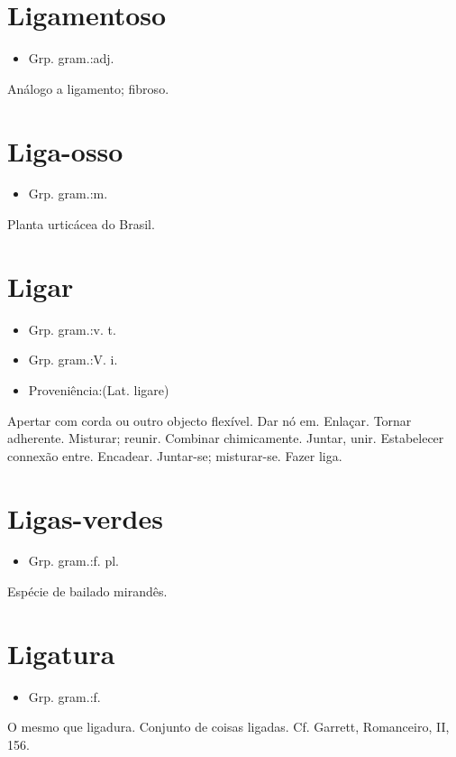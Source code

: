 \section{Ligamentoso}
\begin{itemize}
\item {Grp. gram.:adj.}
\end{itemize}
Análogo a ligamento; fibroso.
\section{Liga-osso}
\begin{itemize}
\item {Grp. gram.:m.}
\end{itemize}
Planta urticácea do Brasil.
\section{Ligar}
\begin{itemize}
\item {Grp. gram.:v. t.}
\end{itemize}
\begin{itemize}
\item {Grp. gram.:V. i.}
\end{itemize}
\begin{itemize}
\item {Proveniência:(Lat. \textunderscore ligare\textunderscore )}
\end{itemize}
Apertar com corda ou outro objecto flexível.
Dar nó em.
Enlaçar.
Tornar adherente.
Misturar; reunir.
Combinar chimicamente.
Juntar, unir.
Estabelecer connexão entre.
Encadear.
Juntar-se; misturar-se.
Fazer liga.
\section{Ligas-verdes}
\begin{itemize}
\item {Grp. gram.:f. pl.}
\end{itemize}
Espécie de bailado mirandês.
\section{Ligatura}
\begin{itemize}
\item {Grp. gram.:f.}
\end{itemize}
O mesmo que \textunderscore ligadura\textunderscore .
Conjunto de coisas ligadas. Cf. Garrett, \textunderscore Romanceiro\textunderscore , II, 156.
